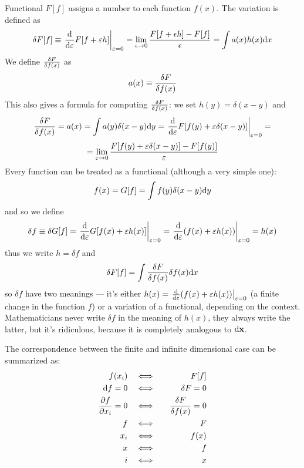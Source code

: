 Functional $F[f]$ assigns a number to each function $f(x)$. The variation is defined as 
\begin{equation*}
  \delta F[f]\equiv\left.{{\rm d}\over{\rm d}\varepsilon}F[f+\varepsilon h] \right|_{\varepsilon=0}=\lim_{\epsilon\to0}{F[f+\epsilon h]-F[f]\over\epsilon}= \int a(x)h(x){\rm d} x
\end{equation*}
We define ${\delta F\over\delta f(x)}$ as 
\begin{equation*}
  a(x)\equiv{\delta F\over\delta f(x)}
\end{equation*}
This also gives a formula for computing ${\delta F\over\delta f(x)}$: we set $h(y)=\delta(x-y)$ and 
\begin{equation*}
  {\delta F\over\delta f(x)}=a(x)=\int a(y)\delta(x-y){\rm d} y= \left.{{\rm d}\over{\rm d}\varepsilon}F[f(y)+\varepsilon\delta(x-y)] \right|_{\varepsilon=0}=
\end{equation*}
\begin{equation*}
  =\lim_{\varepsilon\to0} {F[f(y)+\varepsilon\delta(x-y)]-F[f(y)]\over\varepsilon}
\end{equation*}
Every function can be treated as a functional (although a very simple one): 
\begin{equation*}
  f(x)=G[f]=\int f(y)\delta(x-y){\rm d} y
\end{equation*}
and so we define 
\begin{equation*}
  \delta f\equiv\delta G[f]= \left.{{\rm d}\over{\rm d}\varepsilon}G[f(x)+\varepsilon h(x)] \right|_{\varepsilon=0}= \left.{{\rm d}\over{\rm d}\varepsilon}(f(x)+\varepsilon h(x)) \right|_{\varepsilon=0}= h(x)
\end{equation*}
thus we write $h=\delta f$ and 
\begin{equation*}
  \delta F[f]=\int {\delta F\over\delta f(x)}\delta f(x){\rm d} x
\end{equation*}
so $\delta f$ have two meanings --- it's either $h(x)=\left.{{\rm d}\over{\rm d}\varepsilon}(f(x)+\varepsilon h(x)) \right|_{\varepsilon=0}$ (a finite change in the function $f$) or a variation of a functional, depending on the context. Mathematicians never write $\delta f$ in the meaning of $h(x)$, they always write the latter, but it's ridiculous, because it is completely analogous to ${\rm d}{\bf x}$.

The correspondence between the finite and infinite dimensional case can be summarized as: 
\begin{eqnarray*}
f(x_i) \quad&\Longleftrightarrow&\quad F[f] \\
{\rm d} f=0 \quad&\Longleftrightarrow&\quad \delta F=0 \\
{\partial f\over\partial x_i}=0 \quad&\Longleftrightarrow&\quad {\delta F\over\delta f(x)}=0 \\
f \quad&\Longleftrightarrow&\quad F \\
x_i \quad&\Longleftrightarrow&\quad f(x) \\
x \quad&\Longleftrightarrow&\quad f \\
i \quad&\Longleftrightarrow&\quad x \\
\end{eqnarray*}

